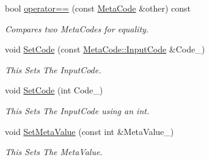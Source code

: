 \begin{DoxyCompactItemize}
bool \hyperlink{classMezzanine_1_1MetaCode_a9766ecefce7d3e8a8e379c8e19fcf414}{operator==} (const \hyperlink{classMezzanine_1_1MetaCode}{MetaCode} \&other) const 
\begin{DoxyCompactList}\small\item\em Compares two MetaCodes for equality. \item\end{DoxyCompactList}\item 
void \hyperlink{classMezzanine_1_1MetaCode_a8c5fa366af24a273ea945aaa8cc7050c}{SetCode} (const \hyperlink{classMezzanine_1_1MetaCode_a3b5633f0145bf3287cf53a3f05b5563c}{MetaCode::InputCode} \&Code\_\-)
\begin{DoxyCompactList}\small\item\em This Sets The InputCode. \item\end{DoxyCompactList}\item 
void \hyperlink{classMezzanine_1_1MetaCode_aeec5b1c0411d1f7851945f4da69c28e2}{SetCode} (int Code\_\-)
\begin{DoxyCompactList}\small\item\em This Sets The InputCode using an int. \item\end{DoxyCompactList}\item 
void \hyperlink{classMezzanine_1_1MetaCode_a6a98dad161c7e45a3f9154b2864db47b}{SetMetaValue} (const int \&MetaValue\_\-)
\begin{DoxyCompactList}\small\item\em This Sets The MetaValue. \item\end{DoxyCompactList}\end{DoxyCompactItemize}
